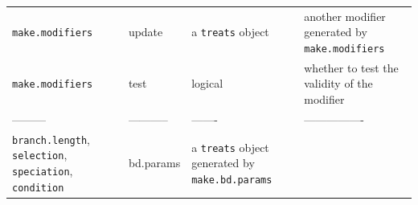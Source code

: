 \documentclass[
]{book}
\begin{document}
\begin{longtable}[]{@{}llll@{}}
\begin{minipage}[t]{0.19\columnwidth}
\texttt{make.modifiers}\strut
\end{minipage} & \begin{minipage}[t]{0.23\columnwidth}\raggedright
update\strut
\end{minipage} & \begin{minipage}[t]{0.14\columnwidth}\raggedright
a \texttt{treats} object\strut
\end{minipage} & \begin{minipage}[t]{0.33\columnwidth}\raggedright
another modifier generated by \texttt{make.modifiers}\strut
\end{minipage}\tabularnewline
\begin{minipage}[t]{0.19\columnwidth}\raggedright
\texttt{make.modifiers}\strut
\end{minipage} & \begin{minipage}[t]{0.23\columnwidth}\raggedright
test\strut
\end{minipage} & \begin{minipage}[t]{0.14\columnwidth}\raggedright
logical\strut
\end{minipage} & \begin{minipage}[t]{0.33\columnwidth}\raggedright
whether to test the validity of the modifier\strut
\end{minipage}\tabularnewline
\begin{minipage}[t]{0.19\columnwidth}\raggedright
---------\strut
\end{minipage} & \begin{minipage}[t]{0.23\columnwidth}\raggedright
-----------\strut
\end{minipage} & \begin{minipage}[t]{0.14\columnwidth}\raggedright
-------\strut
\end{minipage} & \begin{minipage}[t]{0.33\columnwidth}\raggedright
----------------\strut
\end{minipage}\tabularnewline
\begin{minipage}[t]{0.19\columnwidth}\raggedright
\texttt{branch.length}, \texttt{selection}, \texttt{speciation}, \texttt{condition}\strut
\end{minipage} & \begin{minipage}[t]{0.23\columnwidth}\raggedright
bd.params\strut
\end{minipage} & \begin{minipage}[t]{0.14\columnwidth}\raggedright
a \texttt{treats} object generated by \texttt{make.bd.params}\strut
\end{minipage} & \begin{minipage}[t]{0.33\columnwidth}\raggedright

\end{minipage}
\end{longtable}
\end{document}
